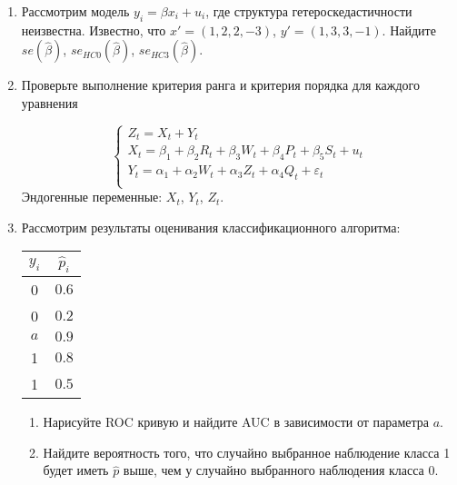 \documentclass[12pt]{article}
\def \hb{\hat{\beta}}
\begin{document}
\begin{enumerate}
\item Рассмотрим модель $y_i = \beta x_i + u_i$, где структура гетероскедастичности неизвестна.
Известно, что $x' = (1, 2, 2, -3)$, $y' = (1, 3, 3, -1)$. Найдите $se(\hb)$, $se_{HC0}(\hb)$, $se_{HC3}(\hb)$.

\item Проверьте выполнение критерия ранга и критерия порядка для каждого уравнения

\[
\begin{cases}
    Z_t = X_t + Y_t \\
    X_t = \beta_1 + \beta_2 R_t + \beta_3 W_t + \beta_4 P_t + \beta_5 S_t + u_t \\
    Y_t = \alpha_1 + \alpha_2 W_t + \alpha_3 Z_t + \alpha_4 Q_t + \varepsilon_t \\
\end{cases}
\]
Эндогенные переменные: $X_t$, $Y_t$, $Z_t$.

\item Рассмотрим результаты оценивания классификационного алгоритма:

\begin{tabular}{@{}cc@{}}
    \toprule
    $y_i$ & $\hat p_i$ \\
    \midrule
    0 & $0.6$ \\
    0 & $0.2$ \\
    $a$ & $0.9$ \\
    1 & $0.8$ \\
    1 & $0.5$ \\
    \bottomrule
\end{tabular}

\begin{enumerate}
    \item Нарисуйте ROC кривую и найдите AUC в зависимости от параметра $a$.
    \item Найдите вероятность того, что случайно выбранное наблюдение класса 1 будет иметь $\hat p$ выше,
    чем у случайно выбранного наблюдения класса 0.
\end{enumerate}
\end{enumerate}
\end{document}
